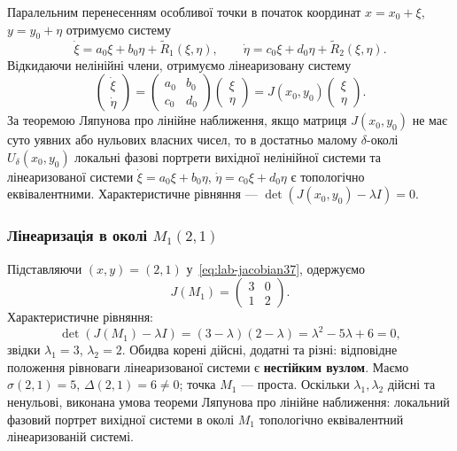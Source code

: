 Паралельним перенесенням особливої точки в початок координат $x=x_0+\xi$, $y=y_0+\eta$ отримуємо систему
\begin{equation*}
\dot{\xi}=a_0\xi+b_0\eta+\tilde{R}_1(\xi,\eta),\qquad
\dot{\eta}=c_0\xi+d_0\eta+\tilde{R}_2(\xi,\eta).
\end{equation*}
Відкидаючи нелінійні члени, отримуємо лінеаризовану систему
\begin{equation*}
\begin{pmatrix}\dot{\xi}\\ \dot{\eta}\end{pmatrix}
=
\begin{pmatrix}a_0 & b_0\\ c_0 & d_0\end{pmatrix}
\begin{pmatrix}\xi\\ \eta\end{pmatrix}
= J(x_0,y_0)\begin{pmatrix}\xi\\ \eta\end{pmatrix}.
\end{equation*}
За теоремою Ляпунова про лінійне наближення, якщо матриця $J(x_0,y_0)$ не має суто уявних або нульових власних чисел, то в достатньо малому $\delta$-околі $U_\delta(x_0,y_0)$ локальні фазові портрети вихідної нелінійної системи та лінеаризованої системи
$\dot{\xi}=a_0\xi+b_0\eta$, $\dot{\eta}=c_0\xi+d_0\eta$ є топологічно еквівалентними.
Характеристичне рівняння --- $\det(J(x_0,y_0)-\lambda I)=0$.

\subsubsection{Лінеаризація в околі $M_1(2,1)$}\label{subsec:lab-M1-37}

Підставляючи $(x,y)=(2,1)$ у~\eqref{eq:lab-jacobian37}, одержуємо
\begin{equation*}
J(M_1)=
\begin{pmatrix}
3 & 0\\
1 & 2
\end{pmatrix}.
\end{equation*}
Характеристичне рівняння:
\begin{equation*}
\det(J(M_1)-\lambda I)=(3-\lambda)(2-\lambda)=\lambda^2-5\lambda+6=0,
\end{equation*}
звідки $\lambda_1=3$, $\lambda_2=2$.
Обидва корені дійсні, додатні та різні: відповідне положення рівноваги лінеаризованої системи є \textbf{нестійким вузлом}.
Маємо $\sigma(2,1)=5$, $\Delta(2,1)=6\neq 0$; точка $M_1$ --- проста.
Оскільки $\lambda_1,\lambda_2$ дійсні та ненульові, виконана умова теореми Ляпунова про лінійне наближення: локальний фазовий портрет вихідної системи в околі $M_1$ топологічно еквівалентний лінеаризованій системі.

